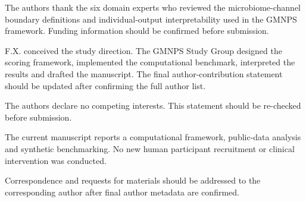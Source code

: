 \documentclass[pdflatex,sn-nature]{sn-jnl}
\begin{document}
\backmatter

The authors thank the six domain experts who reviewed the microbiome-channel boundary definitions and individual-output interpretability used in the GMNPS framework. Funding information should be confirmed before submission.

F.X. conceived the study direction. The GMNPS Study Group designed the scoring framework, implemented the computational benchmark, interpreted the results and drafted the manuscript. The final author-contribution statement should be updated after confirming the full author list.

The authors declare no competing interests. This statement should be re-checked before submission.

The current manuscript reports a computational framework, public-data analysis and synthetic benchmarking. No new human participant recruitment or clinical intervention was conducted.

Correspondence and requests for materials should be addressed to the corresponding author after final author metadata are confirmed.


\end{document}
